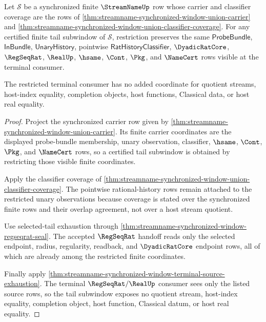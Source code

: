 \begin{theorem}
\label{thm:streamname-synchronized-window-tail-subwindow}
Let $\mathcal S$ be a synchronized finite $\StreamNameUp$ row whose carrier and
classifier coverage are the rows of
\autoref{thm:streamname-synchronized-window-union-carrier} and
\autoref{thm:streamname-synchronized-window-union-classifier-coverage}. For
any certified finite tail subwindow of $\mathcal S$, restriction preserves the
same $\mathsf{ProbeBundle}$, $\mathsf{InBundle}$, $\mathsf{UnaryHistory}$,
pointwise $\mathsf{RatHistoryClassifier}$, $\DyadicRatCore$, $\RegSeqRat$,
$\RealUp$, $\hsame$, $\Cont$, $\Pkg$, and $\NameCert$ rows visible at the
terminal consumer.

The restricted terminal consumer has no added coordinate for quotient streams,
host-index equality, completion objects, host functions, Classical data, or
host real equality.
\end{theorem}
\begin{proof}
Project the synchronized carrier row given by
\autoref{thm:streamname-synchronized-window-union-carrier}. Its finite carrier
coordinates are the displayed probe-bundle membership, unary observation,
classifier, $\hsame$, $\Cont$, $\Pkg$, and $\NameCert$ rows, so a certified
tail subwindow is obtained by restricting those visible finite coordinates.

Apply the classifier coverage of
\autoref{thm:streamname-synchronized-window-union-classifier-coverage}. The
pointwise rational-history rows remain attached to the restricted unary
observations because coverage is stated over the synchronized finite rows and
their overlap agreement, not over a host stream quotient.

Use selected-tail exhaustion through
\autoref{thm:streamname-synchronized-window-regseqrat-seal}. The accepted
$\RegSeqRat$ handoff reads only the selected endpoint, radius, regularity,
readback, and $\DyadicRatCore$ endpoint rows, all of which are already among
the restricted finite coordinates.

Finally apply
\autoref{thm:streamname-synchronized-window-terminal-source-exhaustion}. The
terminal $\RegSeqRat/\RealUp$ consumer sees only the listed source rows, so the
tail subwindow exposes no quotient stream, host-index equality, completion
object, host function, Classical datum, or host real equality.
\end{proof}

